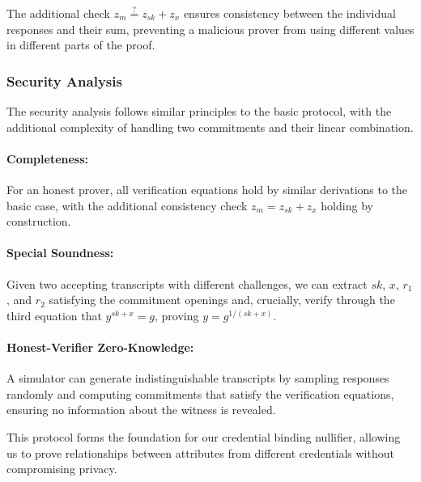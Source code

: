 The additional check $z_m \stackrel{?}{=} z_{sk} + z_x$ ensures consistency between the individual responses and their sum, preventing a malicious prover from using different values in different parts of the proof.

\subsubsection{Security Analysis}

The security analysis follows similar principles to the basic protocol, with the additional complexity of handling two commitments and their linear combination.

\paragraph{Completeness:} For an honest prover, all verification equations hold by similar derivations to the basic case, with the additional consistency check $z_m = z_{sk} + z_x$ holding by construction.

\paragraph{Special Soundness:} Given two accepting transcripts with different challenges, we can extract $sk$, $x$, $r_1$, and $r_2$ satisfying the commitment openings and, crucially, verify through the third equation that $y^{sk+x} = g$, proving $y = g^{1/(sk+x)}$.

\paragraph{Honest-Verifier Zero-Knowledge:} A simulator can generate indistinguishable transcripts by sampling responses randomly and computing commitments that satisfy the verification equations, ensuring no information about the witness is revealed.

This protocol forms the foundation for our credential binding nullifier, allowing us to prove relationships between attributes from different credentials without compromising privacy.






